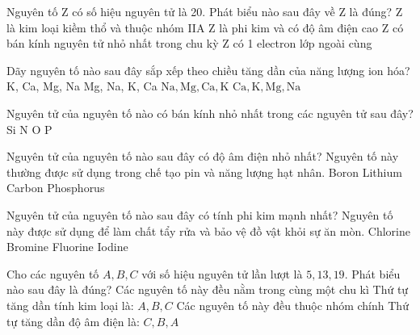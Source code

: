\begin{ex}%
	Nguyên tố Z có số hiệu nguyên tử là 20. Phát biểu nào sau đây về Z là đúng?
	\choice
	{\True Z là kim loại kiềm thổ và thuộc nhóm IIA}
	{Z là phi kim và có độ âm điện cao}
	{Z có bán kính nguyên tử nhỏ nhất trong chu kỳ}
	{Z có 1 electron lớp ngoài cùng}
\end{ex}
\begin{ex}%
	Dãy nguyên tố nào sau đây sắp xếp theo chiều tăng dần của năng lượng ion hóa?
	\choice
	{K, Ca, Mg, Na}
	{Mg, Na, K, Ca}
	{\True $\mathrm{Na}, \mathrm{Mg}, \mathrm{Ca}, \mathrm{K}$}
	{$\mathrm{Ca}, \mathrm{K}, \mathrm{Mg}, \mathrm{Na}$}
\end{ex}
\begin{ex}%
	Nguyên tử của nguyên tố nào có bán kính nhỏ nhất trong các nguyên tử sau đây?
	\choice
	{Si}
	{N}
	{\True O}
	{P}
\end{ex}

\begin{ex}%
	Nguyên tử của nguyên tố nào sau đây có độ âm điện nhỏ nhất? Nguyên tố này thường được sử dụng trong chế tạo pin và năng lượng hạt nhân.
	\choice
	{Boron}
	{\True Lithium}
	{Carbon}
	{Phosphorus}
\end{ex}

\begin{ex}%
	Nguyên tử của nguyên tố nào sau đây có tính phi kim mạnh nhất? Nguyên tố này được sử dụng để làm chất tẩy rửa và bảo vệ đồ vật khỏi sự ăn mòn.
	\choice
	{Chlorine}
	{Bromine}
	{\True Fluorine}
	{Iodine}
\end{ex}
\begin{ex}%
	Cho các nguyên tố $A, B, C$ với số hiệu nguyên tử lần lượt là $5, 13, 19$. Phát biểu nào sau đây là đúng?
	\choice
	{Các nguyên tố này đều nằm trong cùng một chu kì}
	{\True Thứ tự tăng dần tính kim loại là: $A, B, C$}
	{Các nguyên tố này đều thuộc nhóm chính}
	{Thứ tự tăng dần độ âm điện là: $C, B, A$}
\end{ex}

